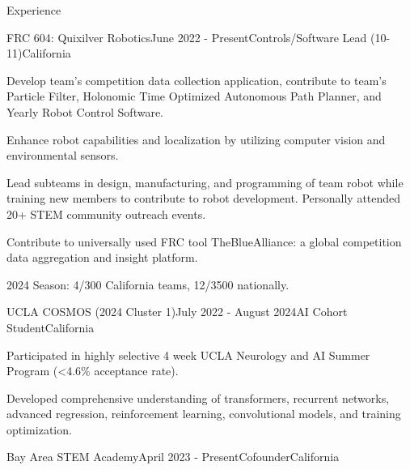 \documentclass[
  11pt, %
]{public/resume/resume} %
\begin{document}
\sloppy


\begin{rSection}{Experience}


  \begin{rSubsection}{FRC 604: Quixilver Robotics}{June 2022 - Present}{Controls/Software Lead (10-11)}{California}
    
    \item Develop team's competition data collection application, contribute to team's Particle Filter, Holonomic Time Optimized Autonomous Path Planner, and Yearly Robot Control Software.
    
    \item Enhance robot capabilities and localization by utilizing computer vision and environmental sensors.
    
    \item Lead subteams in design, manufacturing, and programming of team robot while training new members to contribute to robot development. Personally attended 20+ STEM community outreach events.
    
    \item Contribute to universally used FRC tool TheBlueAlliance: a global competition data aggregation and insight platform.
    
    \item 2024 Season: 4/300 California teams, 12/3500 nationally.
    
  \end{rSubsection}
        
  \begin{rSubsection}{UCLA COSMOS (2024 Cluster 1)}{July 2022 - August 2024}{AI Cohort Student}{California}
    
    \item Participated in highly selective 4 week UCLA Neurology and AI Summer Program (<4.6\% acceptance rate).
    
    \item Developed comprehensive understanding of transformers, recurrent networks, advanced regression, reinforcement learning, convolutional models, and training optimization.
    
  \end{rSubsection}
        
  \begin{rSubsection}{Bay Area STEM Academy}{April 2023 - Present}{Cofounder}{California}
    

\end{rSubsection}
\end{rSection}
\end{document}
